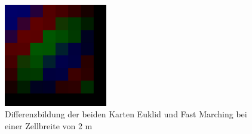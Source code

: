 \begin{figure}[ht]
	\centering
  \includegraphics[width=0.4\textwidth]{abbildungen/vergleich_euklid_fast_marching/differenz_euklid_fast_marching.png}
	\caption{Differenzbildung der beiden Karten Euklid und Fast Marching bei einer Zellbreite von 2 m}
	\label{fig_fast_marching_euclid_difference}
\end{figure}




